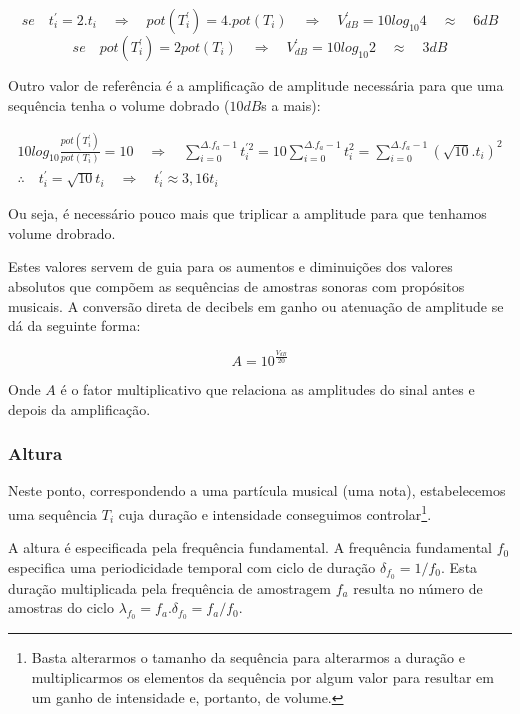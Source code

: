 \begin{equation*}
se \quad  t_i^{'}=2 . t_i \quad \Rightarrow \quad pot(T^{'}_i)=4 . pot(T_i) \quad \Rightarrow \quad V^{'}_{dB}=10log_{10} 4 \quad  \approx \quad 6 dB
\end{equation*}
\begin{equation*}
se \quad pot(T^{'}_i)=2 pot(T_i) \quad \Rightarrow \quad V^{'}_{dB}=10log_{10} 2 \quad \approx \quad 3 dB
\end{equation*}

Outro valor de referência é a amplificação de amplitude
necessária para que uma sequência tenha o volume dobrado ($10dB$s a mais):

\begin{gather}
10log_{10}\frac{pot(T^{'}_i)}{pot(T_i)} = 10 \quad \Rightarrow \quad \sum_{i=0}^{\Delta.f_a-1}t^{'2}_i=10\sum_{i=0}^{\Delta.f_a-1}t_i^2=\sum_{i=0}^{\Delta.f_a-1}(\sqrt{10}.t_i)^2 \\
\therefore \quad t^{'}_i=\sqrt{10}t_i \quad \Rightarrow \quad t^{'}_i \approx 3,16t_i
\end{gather}

Ou seja, é necessário pouco mais que triplicar a amplitude para que tenhamos volume drobrado.

Estes valores servem de guia para os aumentos e diminuições dos valores absolutos que compõem as
sequências de amostras sonoras com propósitos musicais. A conversão direta de decibels
em ganho ou atenuação de amplitude se dá da seguinte forma:

\begin{equation}\label{ampDec}
A = 10^{\frac{V_{dB}}{20}}
\end{equation}

Onde $A$ é o fator multiplicativo que relaciona as amplitudes do sinal antes e depois da amplificação.

\subsubsection{Altura}

Neste ponto, correspondendo a uma partícula musical (uma nota), estabelecemos uma sequência $T_i$ cuja
duração e intensidade conseguimos controlar\footnote{Basta alterarmos o tamanho da sequência para alterarmos
a duração e multiplicarmos os elementos da sequência por algum valor para resultar em um ganho de intensidade e, portanto, de volume.}. 


A altura é especificada pela frequência fundamental. A frequência fundamental $f_0$ especifica uma periodicidade temporal
com ciclo de duração $\delta_{f_0} = 1/f_0$. Esta duração multiplicada pela frequência de amostragem $f_a$ resulta no número de amostras
do ciclo $\lambda_{f_0}=f_a . \delta_{f_0} =f_a/f_0$.

